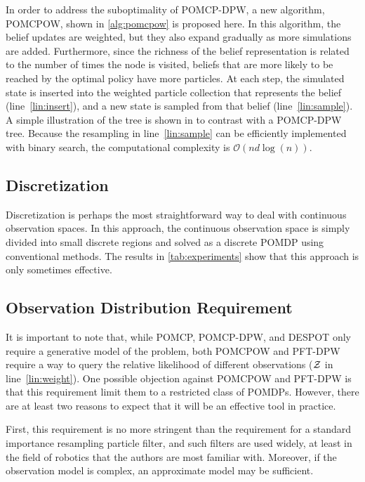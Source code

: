 In order to address the suboptimality of POMCP-DPW, a new algorithm, POMCPOW, shown in \cref{alg:pomcpow} is proposed here.
In this algorithm, the belief updates are weighted, but they also expand gradually as more simulations are added.
Furthermore, since the richness of the belief representation is related to the number of times the node is visited, beliefs that are more likely to be reached by the optimal policy have more particles.
At each step, the simulated state is inserted into the weighted particle collection that represents the belief (line~\ref{lin:insert}), and a new state is sampled from that belief (line~\ref{lin:sample}).
A simple illustration of the tree is shown in  to contrast with a POMCP-DPW tree.
Because the resampling in line~\ref{lin:sample} can be efficiently implemented with binary search, the computational complexity is $\mathcal{O}(n d \log(n))$.

\subsection{Discretization} \label{sec:discretization}

Discretization is perhaps the most straightforward way to deal with continuous observation spaces.
In this approach, the continuous observation space is simply divided into small discrete regions and solved as a discrete POMDP using conventional methods.
The results in \cref{tab:experiments} show that this approach is only sometimes effective.

\subsection{Observation Distribution Requirement}

It is important to note that, while POMCP, POMCP-DPW, and DESPOT only require a generative model of the problem,  both POMCPOW and PFT-DPW require a way to query the relative likelihood of different observations ($\mathcal{Z}$ in line~\ref{lin:weight}).
One possible objection against POMCPOW and PFT-DPW is that this requirement limit them to a restricted class of POMDPs.
However, there are at least two reasons to expect that it will be an effective tool in practice.

First, this requirement is no more stringent than the requirement for a standard importance resampling particle filter, and such filters are used widely, at least in the field of robotics that the authors are most familiar with. 
Moreover, if the observation model is complex, an approximate model may be sufficient.

